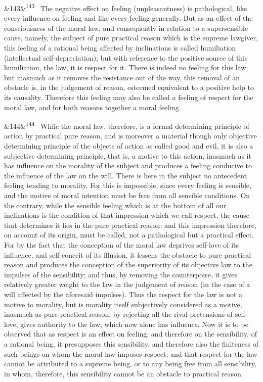 \documentclass[12pt]{article}
\newcommand{\para}[1][]{\par\noindent\ifx&#1&\else\textsuperscript{\footnotesize #1}~\fi}
\begin{document}
\para[143] The negative effect on feeling (unpleasantness) is pathological, like every influence on feeling and like every feeling generally. But as an effect of the consciousness of the moral law, and consequently in relation to a supersensible cause, namely, the subject of pure practical reason which is the supreme lawgiver, this feeling of a rational being affected by inclinations is called humiliation (intellectual self-depreciation); but with reference to the positive source of this humiliation, the law, it is respect for it. There is indeed no feeling for this law; but inasmuch as it removes the resistance out of the way, this removal of an obstacle is, in the judgement of reason, esteemed equivalent to a positive help to its causality. Therefore this feeling may also be called a feeling of respect for the moral law, and for both reasons together a moral feeling.

\para[144] While the moral law, therefore, is a formal determining principle of action by practical pure reason, and is moreover a material though only objective determining principle of the objects of action as called good and evil, it is also a subjective determining principle, that is, a motive to this action, inasmuch as it has influence on the morality of the subject and produces a feeling conducive to the influence of the law on the will. There is here in the subject no antecedent feeling tending to morality. For this is impossible, since every feeling is sensible, and the motive of moral intention must be free from all sensible conditions. On the contrary, while the sensible feeling which is at the bottom of all our inclinations is the condition of that impression which we call respect, the cause that determines it lies in the pure practical reason; and this impression therefore, on account of its origin, must be called, not a pathological but a practical effect. For by the fact that the conception of the moral law deprives self-love of its influence, and self-conceit of its illusion, it lessens the obstacle to pure practical reason and produces the conception of the superiority of its objective law to the impulses of the sensibility; and thus, by removing the counterpoise, it gives relatively greater weight to the law in the judgement of reason (in the case of a will affected by the aforesaid impulses). Thus the respect for the law is not a motive to morality, but is morality itself subjectively considered as a motive, inasmuch as pure practical reason, by rejecting all the rival pretensions of self-love, gives authority to the law, which now alone has influence. Now it is to be observed that as respect is an effect on feeling, and therefore on the sensibility, of a rational being, it presupposes this sensibility, and therefore also the finiteness of such beings on whom the moral law imposes respect; and that respect for the law cannot be attributed to a supreme being, or to any being free from all sensibility, in whom, therefore, this sensibility cannot be an obstacle to practical reason.
\end{document}
